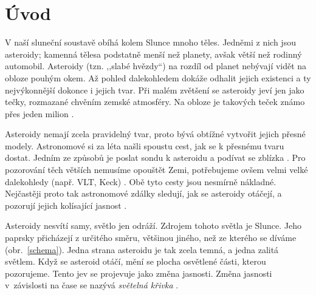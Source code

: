 \documentclass[11pt]{article}
\begin{document}

\newpage
\setcounter{page}{6}
\pagestyle{plain}
\section*{Úvod} 

V naší sluneční soustavě obíhá kolem Slunce mnoho těles. Jedněmi z nich jsou asteroidy; kamenná tělesa podstatně menší než planety, avšak větší než rodinný automobil. Asteroidy (tzn. ,,slabé hvězdy``) na rozdíl od planet nebývají vidět na obloze pouhým okem. Až pohled dalekohledem dokáže odhalit jejich existenci a ty nejvýkonnější dokonce i jejich tvar. Při malém zvětšení se asteroidy jeví jen jako tečky, rozmazané chvěním zemské atmosféry. Na obloze je takových teček známo přes jeden milion \cite{mpc}.

Asteroidy nemají zcela pravidelný tvar, proto bývá obtížné vytvořit jejich přesné modely. Astro\-nomové si za léta našli spoustu cest, jak se k přesnému tvaru dostat. Jedním ze způsobů je poslat sondu k asteroidu a podívat se zblízka \cite{Cheng_2018P&SS..157..104C}. Pro pozorování těch větších nemusíme opouštět Zemi, potřebujeme ovšem velmi velké dalekohledy (např. VLT, Keck) \cite{Vernazza_2021A&A...654A..56V}. Obě tyto cesty jsou nesmírně nákladné. Nejčastěji proto tak astronomové zdálky sledují, jak se asteroidy otáčejí, a pozorují jejich kolísající jasnost \citep{Durech_2023A&A...675A..24D}.

Asteroidy nesvítí samy, světlo jen odráží. Zdrojem tohoto světla je Slunce. Jeho paprsky přicházejí z určitého směru, většinou jiného, než ze kterého se díváme (obr.~\ref{schema}). Jedna strana asteroidu je tak zcela temná, a jedna zalitá světlem. Když se asteroid otáčí, mění se plocha osvětlené části, kterou pozorujeme. Tento jev se projevuje jako změna jasnosti. Změna jasnosti v~závislosti na čase se nazývá {\em světelná křivka\/} \citep{Warner_2009Icar..202..134W}.
\end{document}
